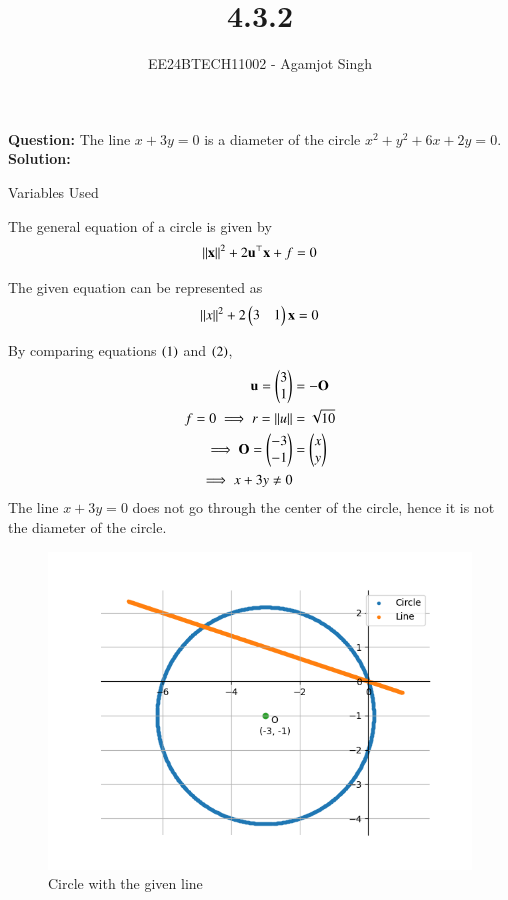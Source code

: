 \documentclass[journal]{IEEEtran}
\begin{document}

\vspace{3cm}

\title{4.3.2}
\author{EE24BTECH11002 - Agamjot Singh}
{\let\newpage\relax\maketitle}

\renewcommand{\thefigure}{\theenumi}
\renewcommand{\thetable}{\theenumi}
\setlength{\intextsep}{10pt} %

\textbf{Question:}
\newline
The line $x + 3y = 0$ is a diameter of the circle $x^2 + y^2 + 6x + 2y = 0$.
\newline
\textbf{Solution:}
\newline

\begin{table}[h!]
	\centering
	
	\caption{Variables Used}
	\label{tab4-4.3.2}
\end{table}

The general equation of a circle is given by 
\begin{align}
	\left\lVert\mathbf{x}\right\rVert^2 + 2\mathbf{u}^\top\mathbf{x} + f = 0
\end{align}

The given equation can be represented as
\begin{align}
	\left\lVert x\right\rVert^2 + 2\begin{pmatrix}3 & 1\end{pmatrix}\mathbf{x} = 0
\end{align}

By comparing equations $\left(1\right)$ and $\left(2\right)$,
\begin{align}
	\mathbf{u} = \begin{pmatrix}3\\1\end{pmatrix} &= -\mathbf{O}\\
	f = 0 \implies r = \left\lVert u\right\rVert &= \sqrt{10}\\
	\implies \mathbf{O} = \begin{pmatrix}-3\\-1\end{pmatrix} &= \begin{pmatrix}x\\y\end{pmatrix}\\
	\implies x + 3y \neq 0 
\end{align}
The line $x + 3y = 0$ does not go through the center of the circle, hence it is not the diameter of the circle.

\begin{figure}[h!]
   \centering
   \includegraphics[width=0.7\linewidth]{figs/graph.png}
   \caption{Circle with the given line}
\end{figure}
\end{document}
